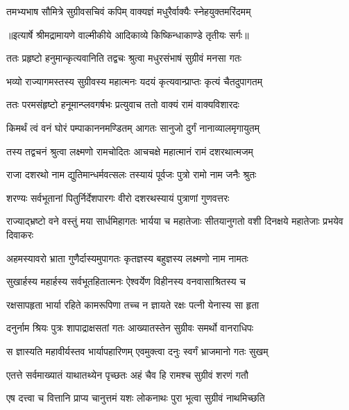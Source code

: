 \twolineshloka
{तमभ्यभाष सौमित्रे सुग्रीवसचिवं कपिम्}
{वाक्यज्ञं मधुरैर्वाक्यैः स्नेहयुक्तमरिंदमम्} %


{॥इत्यार्षे श्रीमद्रामायणे वाल्मीकीये आदिकाव्ये किष्किन्धाकाण्डे तृतीयः सर्गः॥}


\twolineshloka
{ततः प्रहृष्टो हनुमान्कृत्यवानिति तद्वचः}
{श्रुत्वा मधुरसंभाषं सुग्रीवं मनसा गतः} %

\twolineshloka
{भव्यो राज्यागमस्तस्य सुग्रीवस्य महात्मनः}
{यदयं कृत्यवान्प्राप्तः कृत्यं चैतदुपागतम्} %

\twolineshloka
{ततः परमसंहृष्टो हनूमान्प्लवगर्षभः}
{प्रत्युवाच ततो वाक्यं रामं वाक्यविशारदः} %

\twolineshloka
{किमर्थं त्वं वनं घोरं पम्पाकाननमण्डितम्}
{आगतः सानुजो दुर्गं नानाव्यालमृगायुतम्} %

\twolineshloka
{तस्य तद्वचनं श्रुत्वा लक्ष्मणो रामचोदितः}
{आचचक्षे महात्मानं रामं दशरथात्मजम्} %

\twolineshloka
{राजा दशरथो नाम द्युतिमान्धर्मवत्सलः}
{तस्यायं पूर्वजः पुत्रो रामो नाम जनैः श्रुतः} %

\twolineshloka
{शरण्यः सर्वभूतानां पितुर्निर्देशपारगः}
{वीरो दशरथस्यायं पुत्राणां गुणवत्तरः} %

\threelineshloka
{राज्याद्भ्रष्टो वने वस्तुं मया सार्धमिहागतः}
{भार्यया च महातेजाः सीतयानुगतो वशी}
{दिनक्षये महातेजाः प्रभयेव दिवाकरः} %

\twolineshloka
{अहमस्यावरो भ्राता गुणैर्दास्यमुपागतः}
{कृतज्ञस्य बहुज्ञस्य लक्ष्मणो नाम नामतः} %

\twolineshloka
{सुखार्हस्य महार्हस्य सर्वभूतहितात्मनः}
{ऐश्वर्येण विहीनस्य वनवासाश्रितस्य च} %

\twolineshloka
{रक्षसापहृता भार्या रहिते कामरूपिणा}
{तच्च न ज्ञायते रक्षः पत्नी येनास्य सा हृता} %

\twolineshloka
{दनुर्नाम श्रियः पुत्रः शापाद्राक्षसतां गतः}
{आख्यातस्तेन सुग्रीवः समर्थो वानराधिपः} %

\twolineshloka
{स ज्ञास्यति महावीर्यस्तव भार्यापहारिणम्}
{एवमुक्त्वा दनुः स्वर्गं भ्राजमानो गतः सुखम्} %

\twolineshloka
{एतत्ते सर्वमाख्यातं याथातथ्येन पृच्छतः}
{अहं चैव हि रामश्च सुग्रीवं शरणं गतौ} %

\twolineshloka
{एष दत्त्वा च वित्तानि प्राप्य चानुत्तमं यशः}
{लोकनाथः पुरा भूत्वा सुग्रीवं नाथमिच्छति} %

